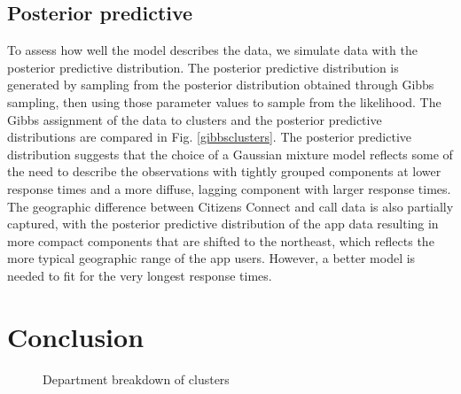 \documentclass[twoside]{article}
\theoremstyle{theorem}
\theoremstyle{theorem}
\theoremstyle{theorem}
\theoremstyle{lemma}
\theoremstyle{definition}
\theoremstyle{example}
\begin{document}
\subsection{Posterior predictive}
To assess how well the model describes the data, we simulate data with the posterior predictive distribution. The posterior predictive distribution is generated by sampling from the posterior distribution obtained through Gibbs sampling, then using those parameter values to sample from the likelihood. The Gibbs assignment of the data to clusters and the posterior predictive distributions are compared in Fig. \ref{gibbsclusters}. The posterior predictive distribution suggests that the choice of a Gaussian mixture model reflects some of the need to describe the observations with tightly grouped components at lower response times and a more diffuse, lagging component with larger response times. The geographic difference between Citizens Connect and call data is also partially captured, with the posterior predictive distribution of the app data resulting in more compact components that are shifted to the northeast, which reflects the more typical geographic range of the app users.  However, a better model is needed to fit for the very longest response times. 

\section{Conclusion}
\begin{figure}
\begin{center}
\caption{Department breakdown of clusters}
\hskip1cm
\end{center}\label{fig:conv}
\vskip -0.2in
\end{figure} 
\end{document}

